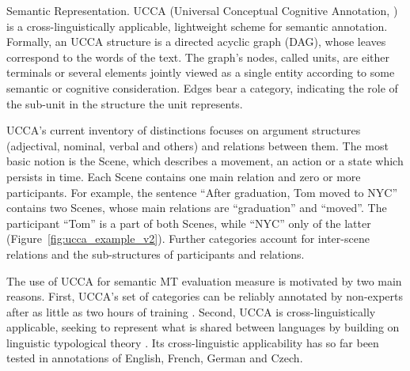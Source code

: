 \documentclass[11pt,letterpaper]{article}
\makeatletter
\renewcommand{\paragraph}{
  \@startsection{paragraph}{4}
  {\z@}{.1ex \@plus .1ex \@minus .1ex}{-1.5em}
  {\normalfont\normalsize\bfseries}
}
\newcommand{\figref}[1]{Figure~\ref{#1}}
\def\parcite#1{\cite{#1}}
\def\inparcite#1{\cite{#1}}
\makeatother
\begin{document}
\paragraph{Semantic Representation.}
UCCA (Universal Conceptual Cognitive Annotation, \inparcite{abend2013universal}) is a
cross-linguistically applicable, lightweight
scheme for semantic annotation. Formally, an UCCA structure is a directed acyclic graph (DAG),
whose leaves correspond to the words of the text.
The graph's nodes, called {\sc units}, are either terminals or several elements jointly
viewed as a single entity according to some semantic or cognitive consideration. Edges bear
a category, indicating the role of the sub-unit in the structure the unit
represents.

UCCA's current inventory of distinctions focuses on argument structures
(adjectival, nominal, verbal and others) and relations between them.
The most basic notion is the Scene, which describes a movement, an
action or a state which persists in time. Each Scene contains one main
relation and zero or more participants. For example, the sentence ``After graduation, Tom moved to NYC''
contains two Scenes, whose main relations are ``graduation'' and ``moved''.
The participant ``Tom'' is a part of both Scenes, while ``NYC'' only of the
latter (\figref{fig:ucca_example_v2}). Further categories account for
inter-scene relations and the sub-structures of participants and relations.

The use of UCCA for semantic MT evaluation measure is motivated by two main reasons. 
First, UCCA's set of categories can
be reliably annotated by non-experts after as little as two hours
of training \parcite{marinotti2014}.
Second, UCCA is cross-linguistically applicable, seeking to
represent what is shared between languages by building on
linguistic typological theory \parcite{Dixon:10a,Dixon:10b,Dixon:12}.
Its cross-linguistic applicability has so far been tested in annotations of
English, French, German and Czech.

\end{document}
